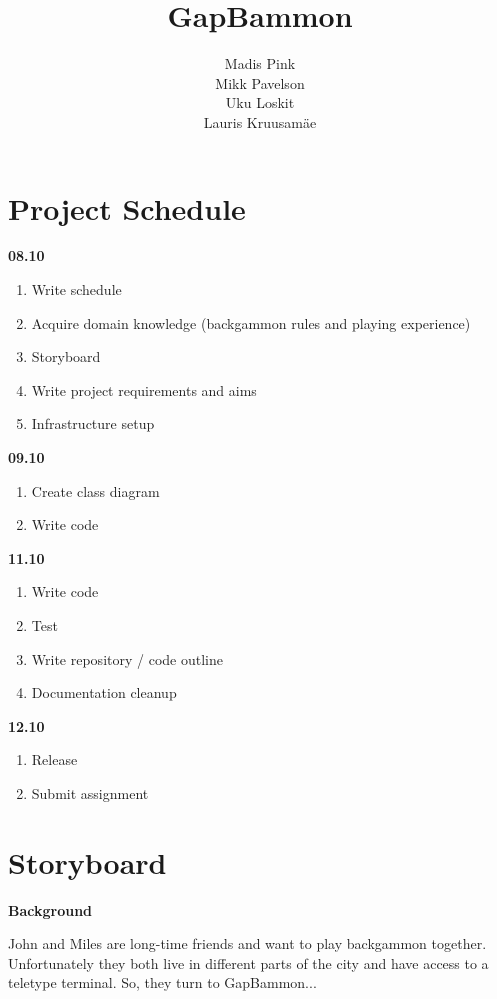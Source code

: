 \documentclass[11pt]{article}
\title{\textbf{GapBammon}}
\author{Madis Pink\\
		Mikk Pavelson\\
		Uku Loskit\\
		Lauris Kruusamäe}
\date{}
\begin{document}
\maketitle

\newpage
\section{Project Schedule}
\textbf{08.10}
\begin{enumerate}[1]
\item Write schedule
\item Acquire domain knowledge (backgammon rules and playing experience)
\item Storyboard
\item Write project requirements and aims
\item Infrastructure setup
\end{enumerate}
\textbf{09.10}
\begin{enumerate}[1]
\item Create class diagram
\item Write code
\end{enumerate}
\textbf{11.10}
\begin{enumerate}[1]
\item Write code
\item Test
\item Write repository / code outline
\item Documentation cleanup
\end{enumerate}
\textbf{12.10}
\begin{enumerate}[1]
\item Release
\item Submit assignment
\end{enumerate}

\newpage
\section{Storyboard}

\textbf{Background}

John and Miles are long-time friends and want to play backgammon together. Unfortunately they both live in different parts of the city and have access to a teletype terminal. So, they turn to GapBammon...
\end{document}
